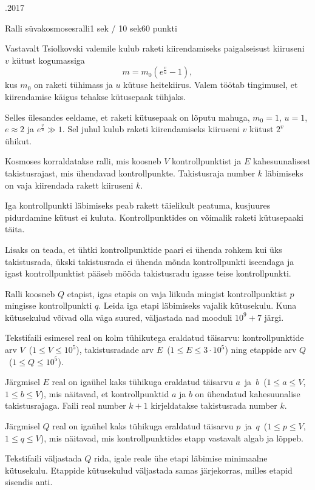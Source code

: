 \documentclass[a4paper,10pt]{article}
\begin{document}
\begin{ol}{\eio}{.2017}{\yle}{}
\begin{yl}{5}{Ralli süvakosmoses}{ralli}{1 sek / 10 sek}{60 punkti}

Vastavalt Tsiolkovski valemile kulub raketi kiirendamiseks paigalseisust kiiruseni $v$ kütust kogumassiga
\[
  m = m_0\left(e^{\frac{v}{u}} - 1\right),
\]
kus $m_0$ on raketi tühimass ja $u$ kütuse heitekiirus. Valem töötab tingimusel, et kiirendamise käigus tehakse kütusepaak tühjaks.

Selles ülesandes eeldame, et raketi kütusepaak on lõputu mahuga, $m_0 = 1$, $u = 1$, $e \approx 2$ ja $e^{\frac{v}{u}} \gg 1$. Sel juhul kulub raketi kiirendamiseks kiiruseni $v$ kütust $2^{v}$ ühikut.

Kosmoses korraldatakse ralli, mis koosneb $V$ kontrollpunktist ja $E$ kahesuunalisest takistus\-rajast,
mis ühendavad kontrollpunkte. Takistusraja number $k$ läbimiseks on vaja kiirendada rakett kiiruseni $k$.

Iga kontrollpunkti läbimiseks peab rakett täielikult peatuma, kusjuures pidurdamine kütust ei kuluta.
Kontrollpunktides on võimalik raketi kütusepaaki täita.

Lisaks on teada, et ühtki kontroll\-punktide paari ei ühenda rohkem kui üks takistusrada,
ükski takistusrada ei ühenda mõnda kontrollpunkti iseendaga ja igast kontrollpunktist
pääseb mööda takistusradu igasse teise kontrollpunkti.

Ralli koosneb $Q$ etapist, igas etapis on vaja liikuda mingist kontrollpunktist $p$ mingisse kontroll\-punkti $q$. Leida iga etapi läbimiseks vajalik kütusekulu. Kuna kütusekulud võivad olla väga suured, väljastada
nad mooduli $10^9 + 7$ järgi.

\sis Tekstifaili \sisf esimesel real on kolm tühikutega eraldatud täisarvu: kontroll\-punktide arv $V$~($1 \le V \le 10^5$), takistusradade arv $E$~($1 \le E \le 3 \cdot 10^5$) ning etappide arv $Q$~($1 \le Q \le 10^5$).

Järgmisel $E$ real on igaühel kaks tühikuga eraldatud täisarvu $a$~ja~$b$~($1 \le a \le V$, $1 \le b \le V$), mis näitavad, et kontrollpunktid $a$ ja $b$ on ühendatud kahesuunalise takistusrajaga. Faili real number $k + 1$ kirjeldatakse takistusrada number $k$.

Järgmisel $Q$ real on igaühel kaks tühikuga eraldatud täisarvu $p$~ja~$q$~($1 \le p \le V$, $1 \le q \le V$), mis näitavad, mis kontroll\-punktides etapp vastavalt algab ja lõppeb.

\val Tekstifaili \valf väljastada $Q$ rida, igale reale ühe etapi läbimise minimaalne kütusekulu. Etappide kütusekulud väljastada samas järjekorras, milles etapid sisendis anti.


\end{yl}
\end{ol}
\end{document}
